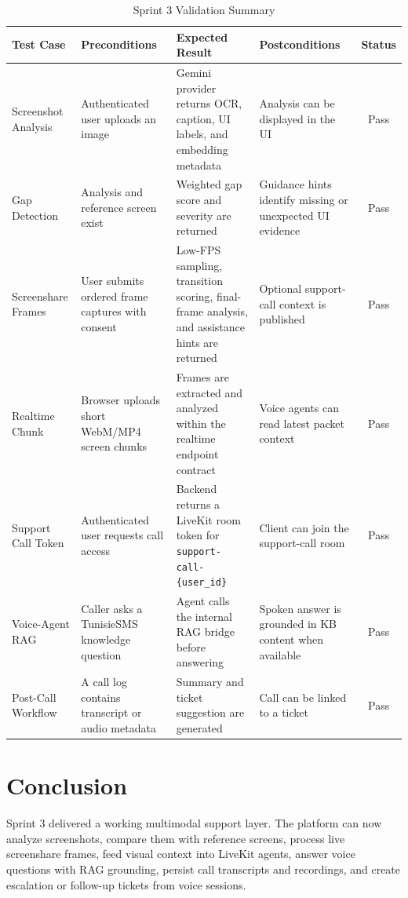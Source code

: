 \begin{table}[H]
\centering
\caption{Sprint 3 Validation Summary}
\label{tab:sprint3-tests}
\renewcommand{\arraystretch}{1.3}
\small
\begin{tabular}{|p{2.4cm}|p{3.0cm}|p{4.1cm}|p{2.5cm}|c|}
\hline
\textbf{Test Case} & \textbf{Preconditions} & \textbf{Expected Result} & \textbf{Postconditions} & \textbf{Status} \\
\hline
Screenshot Analysis & Authenticated user uploads an image & Gemini provider returns OCR, caption, UI labels, and embedding metadata & Analysis can be displayed in the UI & Pass \\
\hline
Gap Detection & Analysis and reference screen exist & Weighted gap score and severity are returned & Guidance hints identify missing or unexpected UI evidence & Pass \\
\hline
Screenshare Frames & User submits ordered frame captures with consent & Low-FPS sampling, transition scoring, final-frame analysis, and assistance hints are returned & Optional support-call context is published & Pass \\
\hline
Realtime Chunk & Browser uploads short WebM/MP4 screen chunks & Frames are extracted and analyzed within the realtime endpoint contract & Voice agents can read latest packet context & Pass \\
\hline
Support Call Token & Authenticated user requests call access & Backend returns a LiveKit room token for \texttt{support-call-\{user\_id\}} & Client can join the support-call room & Pass \\
\hline
Voice-Agent RAG & Caller asks a TunisieSMS knowledge question & Agent calls the internal RAG bridge before answering & Spoken answer is grounded in KB content when available & Pass \\
\hline
Post-Call Workflow & A call log contains transcript or audio metadata & Summary and ticket suggestion are generated & Call can be linked to a ticket & Pass \\
\hline
\end{tabular}
\end{table}

\section*{Conclusion}

Sprint 3 delivered a working multimodal support layer. The platform can now analyze screenshots, compare them with reference screens, process live screenshare frames, feed visual context into LiveKit agents, answer voice questions with RAG grounding, persist call transcripts and recordings, and create escalation or follow-up tickets from voice sessions.


